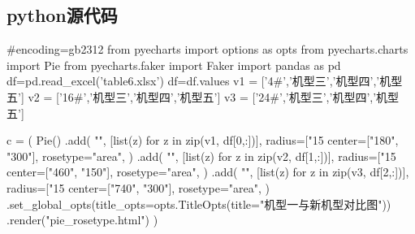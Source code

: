 \documentclass[withoutpreface,bwprint]{cumcmthesis} %
\begin{document}
\begin{appendices}
	\section{python源代码}
	\begin{python}
	#encoding=gb2312
	from pyecharts import options as opts
	from pyecharts.charts import Pie
	from pyecharts.faker import Faker
	import pandas as pd
	df=pd.read_excel('table6.xlsx')
	df=df.values
	v1 = ['4#','机型三','机型四','机型五']
	v2 = ['16#','机型三','机型四','机型五']
	v3 = ['24#','机型三','机型四','机型五']
	
	c = (
		Pie()
		.add(
				"",
			[list(z) for z in zip(v1, df[0,:])],
			radius=["15%
			center=["180", "300"],
			rosetype="area",
			)
		.add(
				"",
			[list(z) for z in zip(v2, df[1,:])],
			radius=["15%
			center=["460", "150"],
			rosetype="area",
			)
		.add(
				"",
			[list(z) for z in zip(v3, df[2,:])],
			radius=["15%
			center=["740", "300"],
			rosetype="area",
			)
			.set_global_opts(title_opts=opts.TitleOpts(title="机型一与新机型对比图"))
			.render("pie_rosetype.html")
		)	
	\end{python}
\end{appendices}
\end{document}
